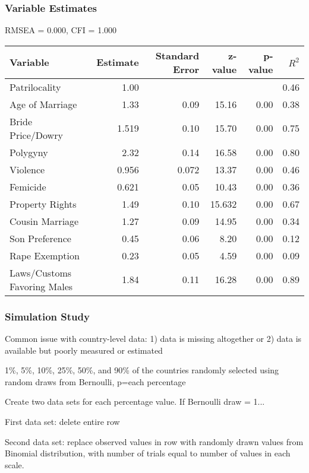 \documentclass{beamer}
\begin{document}
\begin{frame}
\frametitle{Variable Estimates}
\footnotesize
RMSEA = 0.000, CFI = 1.000
\begin{table}[htb]
    \centering
    \tiny
    \begin{tabular}{l|r|r|r|r|r}
     Variable & Estimate & Standard Error & z-value & p-value & $R^2$ \\
     \hline
     Patrilocality & 1.00 & & & & 0.46 \\
     Age of Marriage & 1.33 & 0.09 & 15.16 & 0.00 & 0.38 \\
     Bride Price/Dowry & 1.519 & 0.10 & 15.70 & 0.00 & 0.75 \\
     Polygyny & 2.32 & 0.14 & 16.58 & 0.00 & 0.80 \\
     Violence & 0.956 & 0.072 & 13.37 & 0.00 & 0.46 \\
     Femicide & 0.621 & 0.05 & 10.43 & 0.00 & 0.36 \\
     Property Rights & 1.49 & 0.10 & 15.632 & 0.00 & 0.67 \\
     Cousin Marriage & 1.27 & 0.09 & 14.95 & 0.00 & 0.34 \\
     Son Preference & 0.45 & 0.06 & 8.20 & 0.00 & 0.12 \\
     Rape Exemption & 0.23 & 0.05 & 4.59 & 0.00 & 0.09 \\
     Laws/Customs Favoring Males & 1.84 & 0.11 & 16.28 & 0.00 & 0.89 \\
    \end{tabular}
    \label{res}
\end{table}
\end{frame}

\begin{frame}
\frametitle{Simulation Study}
Common issue with country-level data: 1) data is missing altogether or 2) data is available but poorly measured or estimated
\footnotesize
\itemize
\item 1\%, 5\%, 10\%, 25\%, 50\%, and 90\% of the countries randomly selected using random draws from Bernoulli, p=each percentage
\item Create two data sets for each percentage value. If Bernoulli draw = 1...
\item First data set: delete entire row
\item Second data set: replace observed values in row with randomly drawn values from Binomial distribution, with number of trials equal to number of values in each scale.
\end{frame}
\end{document}
